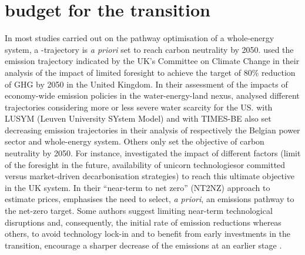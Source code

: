 \section{ budget for the transition}
\label{sec:cs:CO2-budget}
In most studies carried out on the pathway optimisation of a whole-energy system, a -trajectory is \textit{a priori} set to reach carbon neutrality by 2050. \citet{nerini2017myopic} used the emission trajectory indicated by the UK's Committee on Climate Change in their analysis of the impact of limited foresight to achieve the target of 80\% reduction of \gls{GHG} by 2050 in the United Kingdom. In their assessment of the impacts of economy-wide emission policies in the water-energy-land nexus, \citet{licandeo2023assessing} analysed different  trajectories considering more or less severe water scarcity for the US. \citet{poncelet2016myopic} with LUSYM (Leuven University SYstem Model) and \citet{PATHS2050} with TIMES-BE also set decreasing emission trajectories in their analysis of respectively the Belgian power sector and whole-energy system.  Others only set the objective of carbon neutrality by 2050. For instance, \citet{heuberger2018impact} investigated the impact of different factors (\eg limit of the foresight in the future, availability of \og unicorn technologies\fg or committed versus market-driven decarbonisation strategies) to reach this ultimate objective in the UK system. In their ``near-term to net zero'' (NT2NZ) approach to estimate  prices, \citet{kaufman2020near} emphasises the need to select, \textit{a priori}, an emissions pathway to the net-zero target. Some authors suggest limiting near-term technological disruptions and, consequently, the initial rate of emission reductions \cite{wigley1996economic} whereas others, to avoid technology lock-in and to benefit from early investments in the transition, encourage a sharper decrease of the emissions at an earlier stage \cite{vogt2018starting}.

